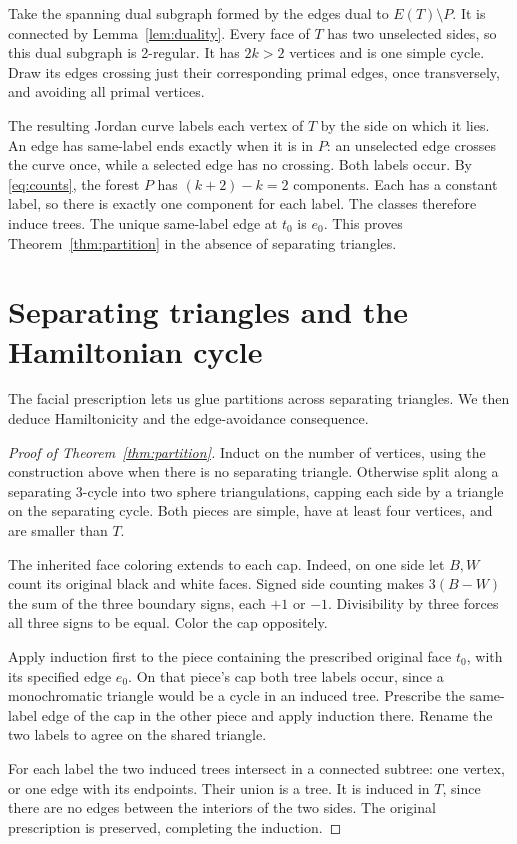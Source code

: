 \documentclass[11pt]{article}
\theoremstyle{remark}
\numberwithin{equation}{section}
\begin{document}
Take the spanning dual subgraph formed by the edges
dual to \(E(T)\setminus P\). It is connected by
Lemma~\ref{lem:duality}. Every face of \(T\) has two
unselected sides, so this dual subgraph is 2-regular.
It has \(2k>2\) vertices and is one simple cycle.
Draw its edges crossing just their corresponding
primal edges, once transversely, and avoiding all
primal vertices.

The resulting Jordan curve labels each vertex of
\(T\) by the side on which it lies. An edge has
same-label ends exactly when it is in \(P\):
an unselected edge crosses the curve once, while
a selected edge has no crossing. Both labels occur.
By \eqref{eq:counts}, the forest \(P\) has
\((k+2)-k=2\) components. Each has a constant label,
so there is exactly one component for each label.
The classes therefore induce trees. The unique
same-label edge at \(t_0\) is \(e_0\).
This proves Theorem~\ref{thm:partition} in the absence
of separating triangles.

\section{Separating triangles and the Hamiltonian cycle}\label{sec:assembly}

The facial prescription lets us glue partitions across separating
triangles. We then deduce Hamiltonicity and the edge-avoidance consequence.

\begin{proof}[Proof of Theorem~\ref{thm:partition}]
Induct on the number of vertices, using the construction
above when there is no separating triangle.
Otherwise split along a separating \(3\)-cycle into
two sphere triangulations, capping each side by a
triangle on the separating cycle. Both pieces are
simple, have at least four vertices, and are smaller
than \(T\).

The inherited face coloring extends to each cap.
Indeed, on one side let \(B,W\) count its original
black and white faces. Signed side counting makes
\(3(B-W)\) the sum of the three boundary signs,
each \(+1\) or \(-1\). Divisibility by three
forces all three signs to be equal. Color the
cap oppositely.

Apply induction first to the piece containing
the prescribed original face \(t_0\), with its
specified edge \(e_0\). On that piece's cap both
tree labels occur, since a monochromatic triangle
would be a cycle in an induced tree.
Prescribe the same-label edge of the cap in the
other piece and apply induction there. Rename
the two labels to agree on the shared triangle.

For each label the two induced trees intersect
in a connected subtree: one vertex, or one edge
with its endpoints. Their union is a tree.
It is induced in \(T\), since there are no edges
between the interiors of the two sides.
The original prescription is preserved, completing
the induction.
\end{proof}
\end{document}
